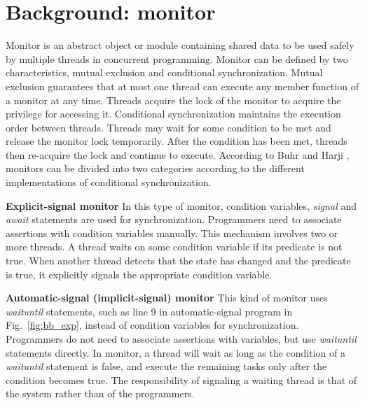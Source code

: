 \documentclass[preprint]{sigplanconf}
\begin{document}
\section{Background: monitor} \label{sec:bg} 
Monitor is an abstract object or module containing shared data to be used safely
by multiple threads in concurrent programming. Monitor can
be defined by two characteristics, mutual exclusion and conditional 
synchronization. Mutual exclusion guarantees that at most one thread can 
execute any member function of a monitor at any time.  Threads  acquire the 
lock of the monitor to acquire the privilege for accessing it. Conditional synchronization 
maintains the execution order between threads. Threads may wait for some 
condition to be met and release the monitor lock temporarily. After the 
condition has been met, threads then re-acquire the lock and continue to 
execute. According to Buhr and Harji \cite{bh05}, monitors can be divided into 
two categories according to the different implementations of conditional 
synchronization. 
\begin{description}
    \item{\bf Explicit-signal monitor} In this type of monitor, condition
        variables, {\em signal} and {\em await} statements are used for synchronization. 
    Programmers need to associate assertions with condition variables manually.
    This mechanism involves two or more threads. A thread  waits on some condition variable 
    if its predicate is not true. When another thread detects that the state has 
    changed and the predicate is true, it explicitly signals the 
    appropriate condition variable.
    \item{\bf Automatic-signal (implicit-signal) monitor} This kind of monitor 
    uses {\em waituntil}
    statements, such as line 9 in automatic-signal program in
    Fig.~\ref{fig:bb_exp}, instead of condition variables for
    synchronization. Programmers do not need to associate assertions with
    variables, but use {\em waituntil} statements directly. In
    monitor, a thread will wait as long as the condition of a {\em waituntil}
    statement is false, and execute the remaining tasks only after the condition 
    becomes true. The responsibility of signaling a waiting thread is that of 
    the system rather than of the programmers. 
\end{description}
\end{document}
